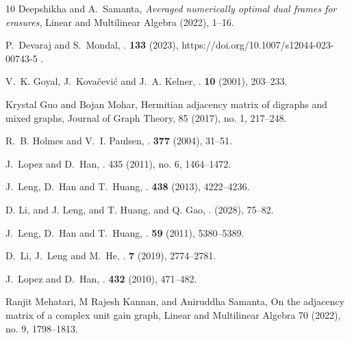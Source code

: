 \documentclass[final,1p,times]{elsarticle}
\begin{document}
\begin{thebibliography}{10}
Deepshikha and A.~Samanta, \emph{Averaged numerically optimal dual frames for
  erasures}, Linear and Multilinear Algebra (2022), 1--16.


P.~Devaraj and S.~Mondal,
.
 \textbf{133} (2023), https://doi.org/10.1007/s12044-023-00743-5 .

V.~K. Goyal, J.~Kova{\v{c}}evi{\'c} and J.~A. Kelner,
.
 \textbf{10} (2001), 203--233.


Krystal Guo and Bojan Mohar, Hermitian adjacency matrix of digraphs and mixed graphs, Journal of Graph Theory, 85 (2017), no. 1, 217–248.



R.~B. Holmes and V.~I. Paulsen,
.
 \textbf{377} (2004), 31--51.


J.~Lopez and D.~Han,
.
 435 (2011), no. 6, 1464–1472.

J.~Leng, D.~Han and T.~Huang,
.
 \textbf{438} (2013), 4222--4236.

D. Li,  and J. Leng,  and T. Huang,  and Q. Gao,
.
  (2028), 75--82.

J.~Leng, D.~Han and T.~Huang,
.
 \textbf{59} (2011), 5380--5389.



D.~Li, J.~Leng and M.~He,
.
 \textbf{7} (2019), 2774--2781.


J.~Lopez and D.~Han,
.
 \textbf{432} (2010), 471--482.



 Ranjit Mehatari, M Rajesh Kannan, and Aniruddha Samanta, On the adjacency matrix of a complex unit gain
graph, Linear and Multilinear Algebra 70 (2022), no. 9, 1798–1813.



\end{thebibliography}
\end{document}
